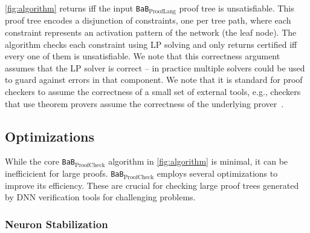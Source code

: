 \documentclass[oneside,11pt,dvipsnames]{book}
\numberwithin{equation}{section}
\theoremstyle{definition}
\theoremstyle{remark}
\newcommand{\prooflang}{\texttt{BaB$_{\text{ProofLang}}$}}
\newcommand{\proofcheck}{\texttt{BaB$_{\text{ProofCheck}}$}}
\begin{document}
 \autoref{fig:algorithm} returns \certified iff the input \prooflang{} proof tree is unsatisfiable. This proof tree encodes a disjunction of constraints, one per tree path, where each constraint represents an activation pattern of the network (the leaf node). The algorithm checks each constraint using LP solving and only returns certified iff every one of them is unsatisfiable.  
We note that this correctness argument assumes that the LP solver is correct -- in practice
multiple solvers could be used to guard against errors in that component.  We note that
it is standard for proof checkers to assume the correctness of a small set of external tools, e.g., checkers that use  theorem provers assume the correctness of the underlying prover~\cite{lammich2023grat}.

\subsection{Optimizations}
While the core \proofcheck{} algorithm in \autoref{fig:algorithm} is minimal, it can be inefficicient for large proofs.
\proofcheck{} employs several optimizations to improve its efficiency. These are crucial for checking large proof trees generated by DNN verification tools for challenging problems.


\subsubsection{Neuron Stabilization}\label{sec:neuron-stabelization} 
\end{document}
